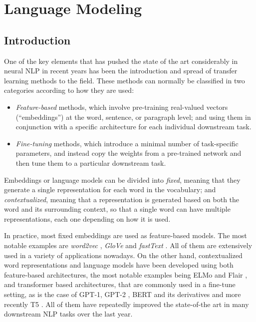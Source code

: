 \chapter{Language Modeling}

\section{Introduction}
One of the key elements that has pushed the state of the art considerably in neural NLP in recent years has been the introduction and spread of transfer learning methods to the field. These methods can normally be classified in two categories according to how they are used:
\begin{itemize}
    \item \emph{Feature-based} methods, which involve pre-training real-valued vectors (``embeddings'') at the word, sentence, or paragraph level; and using them in conjunction with a specific architecture for each individual downstream task.
    \item \emph{Fine-tuning} methods, which introduce a minimal number of task-specific parameters, and instead copy the weights from a pre-trained network and then tune them to a particular downstream task.
\end{itemize}
Embeddings or language models can be divided into \emph{fixed}, meaning that they generate a single representation for each word in the vocabulary; and \emph{contextualized}, meaning that a representation is generated based on both the word and its surrounding context, so that a single word can have multiple representations, each one depending on how it is used.

In practice, most fixed embeddings are used as feature-based models. The most notable examples are \emph{word2vec} \citep{mikolov-etal-2013-distributed}, \emph{GloVe} \citep{pennington-etal-2014-glove} and \emph{fastText} \citep{mikolov-etal-2018-advances}. All of them are extensively used in a variety of applications nowadays. On the other hand, contextualized word representations and language models have been developed using both feature-based architectures, the most notable examples being ELMo and Flair \citep{peters-etal-2018-deep,akbik-etal-2018-contextual}, and transformer based architectures, that are commonly used in a fine-tune setting, as is the case of GPT-1, GPT-2 \citep{radford-etal-2018-improving,radford-etal-2019-language}, BERT and its derivatives \citep{devlin-etal-2019-bert,liu-etal-2019-roberta,lan-etal-2020-albert} and more recently T5 \citep{raffel-etal-2020-exploring}. All of them have repeatedly improved the state-of-the art in many downstream NLP tasks over the last year.

